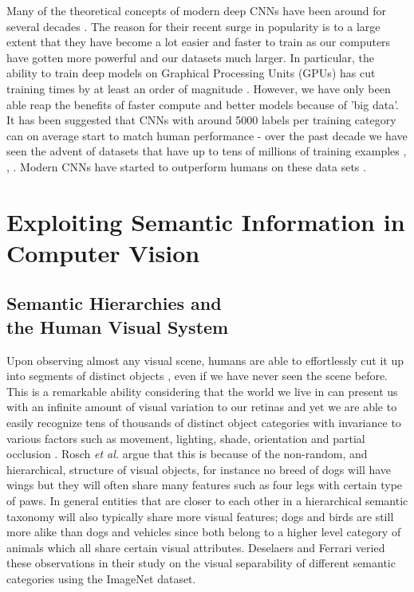 \documentclass[12pt]{report}
\begin{document}
Many of the theoretical concepts of modern deep CNNs have been around for several decades \cite{JurgenSchmidhuber2015}. The reason for their recent surge in popularity is to a large extent that they have become a lot easier and faster to train as our computers have gotten more powerful and our datasets much larger. In particular, the ability to train deep models on Graphical Processing Units (GPUs) has cut training times by at least an order of magnitude \cite{Lecun2015}. However, we have only been able reap the benefits of faster compute and better models because of 'big data'. It has been suggested that CNNs with around 5000 labels per training category can on average start to match human performance \cite{Goodfellow2016} - over the past decade we have seen the advent of datasets that have up to tens of millions of training examples \cite{Russakovsky2015i}, \cite{JiaDeng2009}, \cite{Netzer2011}. Modern CNNs have started to outperform humans on these data sets \cite{Dodge2017}.

\section{Exploiting Semantic Information in \\ Computer Vision}

\subsection{Semantic Hierarchies and \\ the Human Visual System}
Upon observing almost any visual scene, humans are able to effortlessly cut it up into segments of distinct objects \cite{Rosch1976}, even if we have never seen the scene before. This is a remarkable ability considering that the world we live in can present us with an infinite amount of visual variation to our retinas and yet we are able to easily recognize tens of thousands of distinct object categories \cite{Biederman1989} with invariance to various factors such as movement, lighting, shade, orientation and partial occlusion \cite{DiCarlo2012}. Rosch \textit{et al.} \cite{Rosch1976} argue that this is because of the non-random, and hierarchical, structure of visual objects, for instance no breed of dogs will have wings but they will often share many features such as four legs with certain type of paws. In general entities that are closer to each other in a hierarchical semantic taxonomy will also typically share more visual features; dogs and birds are still more alike than dogs and vehicles since both belong to a higher level category of animals which all share certain visual attributes. Deselaers and Ferrari \cite{Deselaers2011} veried these observations in their study on the visual separability of different semantic categories using the ImageNet dataset.
\end{document}
